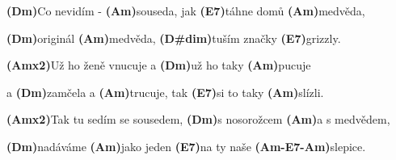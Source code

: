 \documentclass{article}
\newenvironment{song}{%
	\pagebreak%
	\parindent0pt%
    \Large%
}{%
}%
\newcommand{\ch}[1]{\textbf{(#1)}}
\newcommand{\rep}[1]{\hspace{2pt}x#1}
\begin{document}
\begin{song}
\bigskip

\ch{Dm}Co nevidím - \ch{Am}souseda, jak \ch{E7}táhne domů \ch{Am}medvěda, \par
\ch{Dm}originál \ch{Am}medvěda, \ch{D\#dim}tuším značky \ch{E7}grizzly. \par
\ch{Am\rep2}Už ho ženě vnucuje a \ch{Dm}už ho taky \ch{Am}pucuje \par
a \ch{Dm}zamčela a \ch{Am}trucuje, tak \ch{E7}si to taky \ch{Am}slízli. \par

\bigskip

\ch{Am\rep2}Tak tu sedím se sousedem, \ch{Dm}s nosorožcem \ch{Am}a s medvědem, \par
\ch{Dm}nadáváme \ch{Am}jako jeden \ch{E7}na ty naše \ch{Am-E7-Am}slepice. \par

\end{song}
\end{document}
